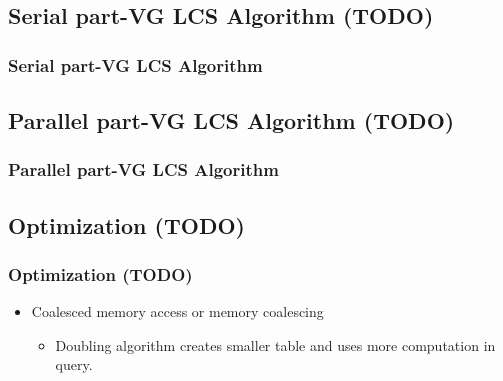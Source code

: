 \subsection{Serial part-VG LCS Algorithm (TODO)}
\begin{frame}
	\frametitle{Serial part-VG LCS Algorithm}
\end{frame}

\subsection{Parallel part-VG LCS Algorithm (TODO)}
\begin{frame}
	\frametitle{Parallel part-VG LCS Algorithm}
\end{frame}

\subsection{Optimization (TODO)}
\begin{frame}
	\frametitle{Optimization (TODO)}
	\begin{itemize}
		\item Coalesced memory access or memory coalescing
			\begin{itemize}
				\item Doubling algorithm creates smaller table
					and uses more computation in query.
			\end{itemize}
	\end{itemize}
\end{frame}